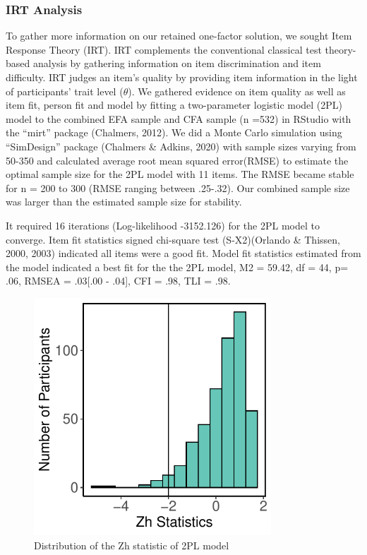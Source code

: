 \documentclass[
  man]{apa6}
\begin{document}
\hypertarget{irt-analysis}{%
\subsubsection{IRT Analysis}\label{irt-analysis}}

To gather more information on our retained one-factor solution, we sought Item Response Theory (IRT). IRT complements the conventional classical test theory-based analysis by gathering information on item discrimination and item difficulty. IRT judges an item's quality by providing item information in the light of participants' trait level (\(\theta\)). We gathered evidence on item quality as well as item fit, person fit and model by fitting a two-parameter logistic model (2PL) model to the combined EFA sample and CFA sample (n =532) in RStudio with the ``mirt'' package (Chalmers, 2012). We did a Monte Carlo simulation using ``SimDesign'' package (Chalmers \& Adkins, 2020) with sample sizes varying from 50-350 and calculated average root mean squared error(RMSE) to estimate the optimal sample size for the 2PL model with 11 items. The RMSE became stable for n = 200 to 300 (RMSE ranging between .25-.32). Our combined sample size was larger than the estimated sample size for stability.

It required 16 iterations (Log-likelihood -3152.126) for the 2PL model to converge. Item fit statistics signed chi-square test (S-X2)(Orlando \& Thissen, 2000, 2003) indicated all items were a good fit. Model fit statistics estimated from the model indicated a best fit for the the 2PL model, M2 = 59.42, df = 44, p= .06, RMSEA = .03{[}.00 - .04{]}, CFI = .98, TLI = .98.

\begin{figure}
\includegraphics[width=3.5in]{Figures/600/personfit} \caption{Distribution of the Zh statistic of 2PL model}\label{fig:figfmisfit}
\end{figure}
\end{document}
